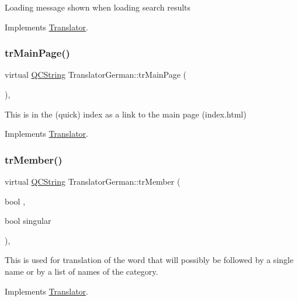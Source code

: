 Loading message shown when loading search results 

Implements \mbox{\hyperlink{class_translator}{Translator}}.

\mbox{\label{class_translator_german_a465313f7321ce42fc77cc1fc0c45b7dc}} 
\subsubsection{\texorpdfstring{trMainPage()}{trMainPage()}}
{\footnotesize\ttfamily virtual \mbox{\hyperlink{class_q_c_string}{Q\+C\+String}} Translator\+German\+::tr\+Main\+Page (\begin{DoxyParamCaption}{ }\end{DoxyParamCaption})\hspace{0.3cm}{\ttfamily [inline]}, {\ttfamily [virtual]}}

This is in the (quick) index as a link to the main page (index.\+html) 

Implements \mbox{\hyperlink{class_translator}{Translator}}.

\mbox{\label{class_translator_german_ae5e008b742cf250fce802f080cd5d509}} 
\subsubsection{\texorpdfstring{trMember()}{trMember()}}
{\footnotesize\ttfamily virtual \mbox{\hyperlink{class_q_c_string}{Q\+C\+String}} Translator\+German\+::tr\+Member (\begin{DoxyParamCaption}\item[{bool}]{,  }\item[{bool}]{singular }\end{DoxyParamCaption})\hspace{0.3cm}{\ttfamily [inline]}, {\ttfamily [virtual]}}

This is used for translation of the word that will possibly be followed by a single name or by a list of names of the category. 

Implements \mbox{\hyperlink{class_translator}{Translator}}.

\mbox{\label{class_translator_german_a7160668857ce1ab0405a12739217f451}} 
